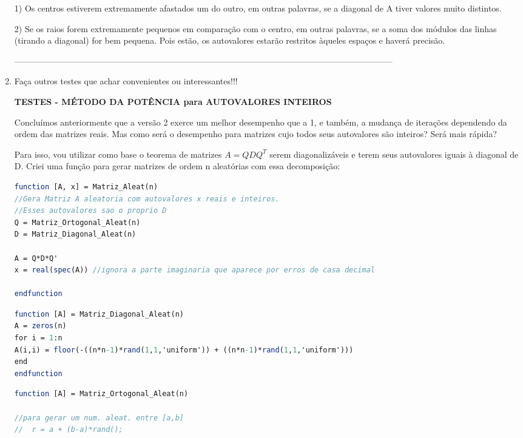 \documentclass[leqno]{article}
\numberwithin{equation}{section}
\begin{document}
\begin{enumerate}
		1) Os centros estiverem extremamente afastados um do outro, em outras palavras, se a diagonal de A tiver valores muito distintos.
		
		2) Se os raios forem extremamente pequenos em comparação com o centro, em outras palavras, se a soma dos módulos das linhas (tirando a diagonal) for bem pequena. Pois estão, os autovalores estarão restritos àqueles espaços e haverá precisão.
		
--------------------------------------------------------------------------------------------------------------------------------------		
		\item Faça outros testes que achar convenientes ou interessantes!!! 
		
		
		\textbf{{\large TESTES - MÉTODO DA POTÊNCIA para AUTOVALORES INTEIROS}}
		
		Concluímos anteriormente que a versão 2 exerce um melhor desempenho que a 1, e também, a mudança de iterações dependendo da ordem das matrizes reais.
		Mas como será o desempenho para matrizes cujo todos seus autovalores são inteiros? Será mais rápida?
		
		Para isso, vou utilizar como base o teorema de matrizes $A = QDQ^T$ serem diagonalizáveis e terem seus autovalores iguais à diagonal de D.
		Criei uma função para gerar matrizes de ordem n aleatórias com essa decomposição:
		
		\begin{sol}
		\begin{lstlisting}[style=mystyle, language=Scilab]
function [A, x] = Matriz_Aleat(n)
//Gera Matriz A aleatoria com autovalores x reais e inteiros.
//Esses autovalores sao o proprio D
Q = Matriz_Ortogonal_Aleat(n)
D = Matriz_Diagonal_Aleat(n)

A = Q*D*Q'
x = real(spec(A)) //ignora a parte imaginaria que aparece por erros de casa decimal

endfunction			
		\end{lstlisting}
		\begin{lstlisting}[style=mystyle, language=Scilab]	
function [A] = Matriz_Diagonal_Aleat(n)
A = zeros(n)
for i = 1:n
A(i,i) = floor(-((n*n-1)*rand(1,1,'uniform')) + ((n*n-1)*rand(1,1,'uniform')))
end
endfunction		
		\end{lstlisting}	
		\begin{lstlisting}[style=mystyle, language=Scilab]
function [A] = Matriz_Ortogonal_Aleat(n)

//para gerar um num. aleat. entre [a,b]
//  r = a + (b-a)*rand();


\end{lstlisting}
\end{sol}
\end{enumerate}
\end{document}
